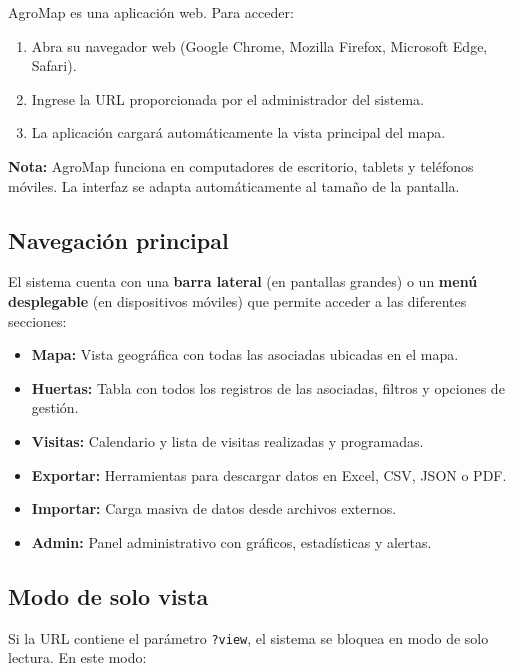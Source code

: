\documentclass[12pt]{article}
\begin{document}
AgroMap es una aplicación web. Para acceder:

\begin{enumerate}[nosep]
  \item Abra su navegador web (Google Chrome, Mozilla Firefox, Microsoft Edge, Safari).
  \item Ingrese la URL proporcionada por el administrador del sistema.
  \item La aplicación cargará automáticamente la vista principal del mapa.
\end{enumerate}

\begin{infobox}
  \textbf{Nota:} AgroMap funciona en computadores de escritorio, tablets y teléfonos móviles. La interfaz se adapta automáticamente al tamaño de la pantalla.
\end{infobox}

\subsection{Navegación principal}
\label{subsec:navegacion}

El sistema cuenta con una \textbf{barra lateral} (en pantallas grandes) o un \textbf{menú desplegable} (en dispositivos móviles) que permite acceder a las diferentes secciones:

\begin{itemize}[nosep]
  \item \textbf{Mapa:} Vista geográfica con todas las asociadas ubicadas en el mapa.
  \item \textbf{Huertas:} Tabla con todos los registros de las asociadas, filtros y opciones de gestión.
  \item \textbf{Visitas:} Calendario y lista de visitas realizadas y programadas.
  \item \textbf{Exportar:} Herramientas para descargar datos en Excel, CSV, JSON o PDF.
  \item \textbf{Importar:} Carga masiva de datos desde archivos externos.
  \item \textbf{Admin:} Panel administrativo con gráficos, estadísticas y alertas.
\end{itemize}

\subsection{Modo de solo vista}
\label{subsec:solo-vista}

Si la URL contiene el parámetro \texttt{?view}, el sistema se bloquea en modo de solo lectura. En este modo:
\end{document}

